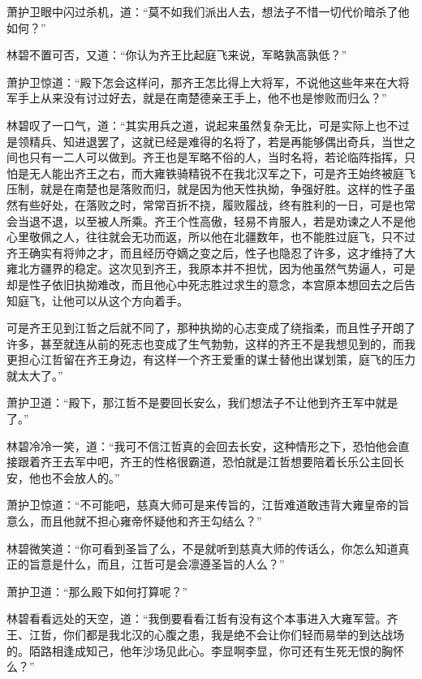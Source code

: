 萧护卫眼中闪过杀机，道：“莫不如我们派出人去，想法子不惜一切代价暗杀了他如何？”

林碧不置可否，又道：“你认为齐王比起庭飞来说，军略孰高孰低？”

萧护卫惊道：“殿下怎会这样问，那齐王怎比得上大将军，不说他这些年来在大将军手上从来没有讨过好去，就是在南楚德亲王手上，他不也是惨败而归么？”

林碧叹了一口气，道：“其实用兵之道，说起来虽然复杂无比，可是实际上也不过是领精兵、知进退罢了，这就已经是难得的名将了，若是再能够偶出奇兵，当世之间也只有一二人可以做到。齐王也是军略不俗的人，当时名将，若论临阵指挥，只怕是无人能出齐王之右，而大雍铁骑精锐不在我北汉军之下，可是齐王始终被庭飞压制，就是在南楚也是落败而归，就是因为他天性执拗，争强好胜。这样的性子虽然有些好处，在落败之时，常常百折不挠，履败履战，终有胜利的一日，可是也常会当退不退，以至被人所乘。齐王个性高傲，轻易不肯服人，若是劝谏之人不是他心里敬佩之人，往往就会无功而返，所以他在北疆数年，也不能胜过庭飞，只不过齐王确实有将帅之才，而且经历夺嫡之变之后，性子也隐忍了许多，这才维持了大雍北方疆界的稳定。这次见到齐王，我原本并不担忧，因为他虽然气势逼人，可是却是性子依旧执拗难改，而且他心中死志胜过求生的意念，本宫原本想回去之后告知庭飞，让他可以从这个方向着手。

可是齐王见到江哲之后就不同了，那种执拗的心志变成了绕指柔，而且性子开朗了许多，甚至就连从前的死志也变成了生气勃勃，这样的齐王不是我想见到的，而我更担心江哲留在齐王身边，有这样一个齐王爱重的谋士替他出谋划策，庭飞的压力就太大了。”

萧护卫道：“殿下，那江哲不是要回长安么，我们想法子不让他到齐王军中就是了。”

林碧冷冷一笑，道：“我可不信江哲真的会回去长安，这种情形之下，恐怕他会直接跟着齐王去军中吧，齐王的性格很霸道，恐怕就是江哲想要陪着长乐公主回长安，他也不会放人的。”

萧护卫惊道：“不可能吧，慈真大师可是来传旨的，江哲难道敢违背大雍皇帝的旨意么，而且他就不担心雍帝怀疑他和齐王勾结么？”

林碧微笑道：“你可看到圣旨了么，不是就听到慈真大师的传话么，你怎么知道真正的旨意是什么，而且，江哲可是会凛遵圣旨的人么？”

萧护卫道：“那么殿下如何打算呢？”

林碧看看远处的天空，道：“我倒要看看江哲有没有这个本事进入大雍军营。齐王、江哲，你们都是我北汉的心腹之患，我是绝不会让你们轻而易举的到达战场的。陌路相逢成知己，他年沙场见此心。李显啊李显，你可还有生死无恨的胸怀么？”

